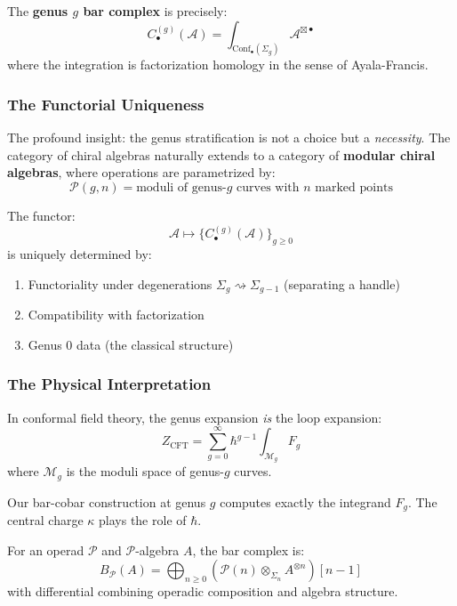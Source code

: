 The \textbf{genus $g$ bar complex} is precisely:
$$C_{\bullet}^{(g)}(\mathcal{A}) = \int_{\mathrm{Conf}_{\bullet}(\Sigma_g)} 
\mathcal{A}^{\boxtimes \bullet}$$
where the integration is factorization homology in the sense of Ayala-Francis.

\subsubsection{The Functorial Uniqueness}

The profound insight: the genus stratification is not a choice but a \emph{necessity}.
The category of chiral algebras naturally extends to a category of \textbf{modular
chiral algebras}, where operations are parametrized by:
$$\mathcal{P}(g,n) = \text{moduli of genus-}g\text{ curves with }n\text{ marked points}$$

The functor:
$$\mathcal{A} \mapsto \{ C_{\bullet}^{(g)}(\mathcal{A}) \}_{g \geq 0}$$
is uniquely determined by:
\begin{enumerate}
\item Functoriality under degenerations $\Sigma_g \rightsquigarrow \Sigma_{g-1}$
(separating a handle)
\item Compatibility with factorization
\item Genus 0 data (the classical structure)
\end{enumerate}

\subsubsection{The Physical Interpretation}

In conformal field theory, the genus expansion \emph{is} the loop expansion:
$$Z_{\text{CFT}} = \sum_{g=0}^{\infty} \hbar^{g-1} \int_{\mathcal{M}_g} F_g$$
where $\mathcal{M}_g$ is the moduli space of genus-$g$ curves.

Our bar-cobar construction at genus $g$ computes exactly the integrand $F_g$.
The central charge $\kappa$ plays the role of $\hbar$.

\begin{theorem}\label{thm:operadic-bar}
For an operad $\mathcal{P}$ and $\mathcal{P}$-algebra $A$, the bar complex is:
$$B_{\mathcal{P}}(A) = \bigoplus_{n \geq 0} (\mathcal{P}(n) \otimes_{\Sigma_n} A^{\otimes n})[n-1]$$
with differential combining operadic composition and algebra structure.
\end{theorem}

